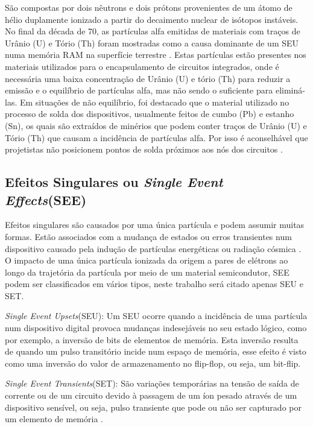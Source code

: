 \documentclass[a4paper,12pt,brazil]{ufms-cpcx}
\begin{document}
São compostas por dois nêutrons e dois prótons provenientes de um átomo de hélio duplamente ionizado a partir do decaimento nuclear de isótopos instáveis. No final da década de 70, as partículas alfa emitidas de materiais com traços de Urânio (U) e Tório (Th) foram mostradas como a causa dominante de um SEU numa memória RAM na superfície terrestre \cite{Woods:1978}. Estas partículas estão presentes nos materiais utilizados para o encapsulamento de circuitos integrados, onde é necessária uma baixa concentração de Urânio (U) e tório (Th) para reduzir a emissão e o equilíbrio de partículas alfa, mas não sendo o suficiente para eliminá-las. Em situações de não equilíbrio, foi destacado que o material utilizado no processo de solda dos dispositivos, usualmente feitos de cumbo (Pb) e estanho (Sn), os quais são extraídos de minérios que podem conter traços de Urânio (U) e Tório (Th) que causam a incidência de partículas alfa. Por isso é aconselhável que projetistas não posicionem pontos de solda próximos aos nós dos circuitos \cite{Velazco:2007}.
	

\subsection{Efeitos Singulares ou \textit{Single Event Effects}(SEE)} \label{subsec:EfeitosSingulares}

Efeitos singulares são causados por uma única partícula e podem assumir muitas formas. Estão associados com a mudança de estados ou erros transientes num dispositivo causado pela indução de partículas energéticas ou radiação cósmica \cite{Yu:2008}. O impacto de uma única partícula ionizada da origem a pares de elétrons ao longo da trajetória da partícula por meio de um material semicondutor, SEE podem ser classificados em vários tipos, neste trabalho será citado apenas SEU e SET.

\textit{Single Event Upsets}(SEU): Um SEU ocorre quando a incidência de uma partícula num dispositivo digital provoca mudanças indesejáveis no seu estado lógico, como por exemplo, a inversão de bits de elementos de memória. Esta inversão resulta de quando um pulso transitório incide num espaço de memória, esse efeito é visto como uma inversão do valor de armazenamento no flip-flop, ou seja, um bit-flip.

\textit{Single Event Transients}(SET): São variações temporárias na tensão de saída de corrente ou de um circuito
devido à passagem de um íon pesado através de um dispositivo sensível, ou seja, pulso transiente que pode ou não ser capturado por um elemento de memória \cite{Ecoffet:1994}.
\end{document}
